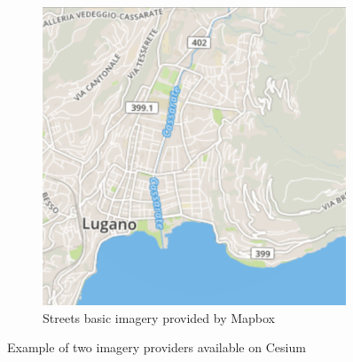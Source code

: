 \begin{itemize}
\begin{figure} [h]
\begin{subfigure}[b]{0.3\textwidth}
			\includegraphics[width=0.993\textwidth]{chapter2/images/Mapbox-Map}
			\caption{Streets basic imagery provided by Mapbox}
			\label{fig:Mapbox-Map}
		\end{subfigure}
		\caption{Example of two imagery providers available on Cesium}
	\end{figure}


\end{itemize}
